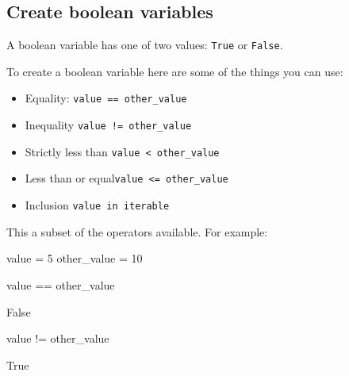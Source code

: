 \subsection{Create boolean variables}
\label{sec:create_boolean_variables}

A boolean variable has one of two values: \texttt{True} or \texttt{False}.


To create a boolean variable here are some of the things you can use:
\begin{itemize}
\item 

Equality: \texttt{value == other\_value}

\item 

Inequality \texttt{value != other\_value}

\item 

Strictly less than \texttt{value < other\_value}

\item 

Less than or equal\texttt{value <= other\_value}

\item 

Inclusion \texttt{value in iterable}

\end{itemize}


This a subset of the operators available.
For example:




\begin{pyin}
value = 5
other_value = 10

value == other_value
\end{pyin}





\begin{raw}
False
\end{raw}







\begin{pyin}
value != other_value
\end{pyin}





\begin{raw}
True
\end{raw}







